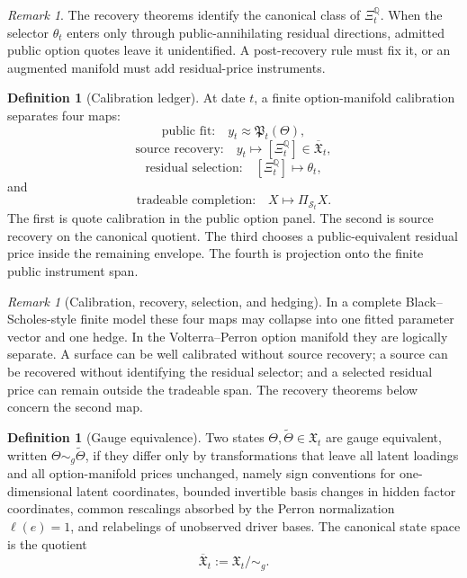 \documentclass[11pt,a4paper]{amsart}
\theoremstyle{plain}
\theoremstyle{definition}
\newtheorem{definition}[theorem]{Definition}
\theoremstyle{remark}
\newtheorem{remark}[theorem]{Remark}
\newcommand{\QQ}{\mathbb{Q}}
\newcommand{\cS}{\mathcal{S}}
\begin{document}
\begin{remark}
The recovery theorems identify the canonical class of \(\Xi_t^\QQ\).  When the selector
\(\theta_t\) enters only through public-annihilating residual directions, admitted public option
quotes leave it unidentified.  A post-recovery rule must fix it, or an augmented manifold must add
residual-price instruments.
\end{remark}

\begin{definition}[Calibration ledger]\label{def:calibration-ledger}
At date \(t\), a finite option-manifold calibration separates four maps:
\[
        \text{public fit:}\quad
        y_t\approx \mathfrak P_t(\Theta),
\]
\[
        \text{source recovery:}\quad
        y_t\mapsto [\Xi_t^\QQ]\in\overline{\mathfrak X}_t,
\]
\[
        \text{residual selection:}\quad
        [\Xi_t^\QQ]\mapsto \theta_t,
\]
and
\[
        \text{tradeable completion:}\quad
        X\mapsto \Pi_{\cS_t}X .
\]
The first is quote calibration in the public option panel.  The second is source recovery on the
canonical quotient.  The third chooses a public-equivalent residual price inside the remaining
envelope.  The fourth is projection onto the finite public instrument span.
\end{definition}

\begin{remark}[Calibration, recovery, selection, and hedging]\label{rem:calibration-not-single-inverse}
In a complete Black--Scholes-style finite model these four maps may collapse into one fitted
parameter vector and one hedge.  In the Volterra--Perron option manifold they are logically
separate.  A surface can be well calibrated without source recovery; a source can be recovered
without identifying the residual selector; and a selected residual price can remain outside the
tradeable span.  The recovery theorems below concern the second map.
\end{remark}

\begin{definition}[Gauge equivalence]\label{def:gauge}
Two states \(\Theta,\widetilde\Theta\in\mathfrak X_t\) are gauge equivalent, written
\(\Theta\sim_g\widetilde\Theta\), if they differ only by transformations that leave all latent
loadings and all option-manifold prices unchanged, namely sign conventions for one-dimensional
latent coordinates, bounded invertible basis changes in hidden factor coordinates, common rescalings
absorbed by the Perron normalization \(\ell(e)=1\), and relabelings of unobserved driver bases.
The canonical state space is the quotient
\[
        \overline{\mathfrak X}_t:=\mathfrak X_t/\!\sim_g.
\]
\end{definition}
\end{document}
